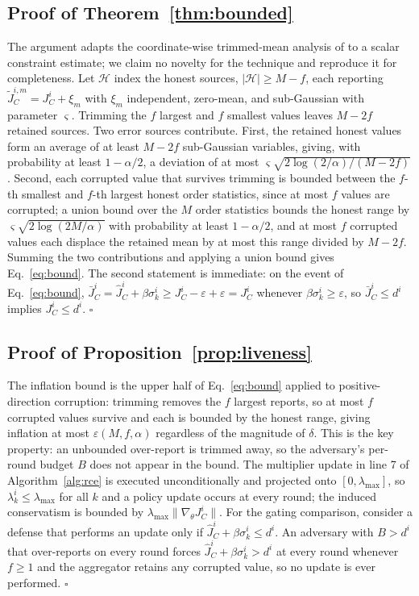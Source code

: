 \documentclass{article}
\begin{document}
\subsection{Proof of Theorem~\ref{thm:bounded}}

The argument adapts the coordinate-wise trimmed-mean analysis of \citet{yin2018byzantine} to a scalar constraint estimate; we claim no novelty for the technique and reproduce it for completeness. Let $\mathcal{H}$ index the honest sources, $|\mathcal{H}| \ge M-f$, each reporting $\tilde J^{i,m}_C = J^i_C + \xi_m$ with $\xi_m$ independent, zero-mean, and sub-Gaussian with parameter $\varsigma$. Trimming the $f$ largest and $f$ smallest values leaves $M-2f$ retained sources. Two error sources contribute. First, the retained honest values form an average of at least $M-2f$ sub-Gaussian variables, giving, with probability at least $1-\alpha/2$, a deviation of at most $\varsigma\sqrt{2\log(2/\alpha)/(M-2f)}$. Second, each corrupted value that survives trimming is bounded between the $f$-th smallest and $f$-th largest honest order statistics, since at most $f$ values are corrupted; a union bound over the $M$ order statistics bounds the honest range by $\varsigma\sqrt{2\log(2M/\alpha)}$ with probability at least $1-\alpha/2$, and at most $f$ corrupted values each displace the retained mean by at most this range divided by $M-2f$. Summing the two contributions and applying a union bound gives Eq.~\eqref{eq:bound}. The second statement is immediate: on the event of Eq.~\eqref{eq:bound}, $\bar J^i_C = \hat J^i_C + \beta\sigma^i_k \ge J^i_C - \varepsilon + \varepsilon = J^i_C$ whenever $\beta\sigma^i_k \ge \varepsilon$, so $\bar J^i_C \le d^i$ implies $J^i_C \le d^i$. $\square$

\subsection{Proof of Proposition~\ref{prop:liveness}}

The inflation bound is the upper half of Eq.~\eqref{eq:bound} applied to positive-direction corruption: trimming removes the $f$ largest reports, so at most $f$ corrupted values survive and each is bounded by the honest range, giving inflation at most $\varepsilon(M,f,\alpha)$ regardless of the magnitude of $\delta$. This is the key property: an unbounded over-report is trimmed away, so the adversary's per-round budget $B$ does not appear in the bound. The multiplier update in line 7 of Algorithm~\ref{alg:rce} is executed unconditionally and projected onto $[0,\lambda_{\max}]$, so $\lambda^i_k \le \lambda_{\max}$ for all $k$ and a policy update occurs at every round; the induced conservatism is bounded by $\lambda_{\max}\|\nabla_\theta J^i_C\|$. For the gating comparison, consider a defense that performs an update only if $\hat J^i_C + \beta\sigma^i_k \le d^i$. An adversary with $B > d^i$ that over-reports on every round forces $\hat J^i_C + \beta\sigma^i_k > d^i$ at every round whenever $f \ge 1$ and the aggregator retains any corrupted value, so no update is ever performed. $\square$
\end{document}
